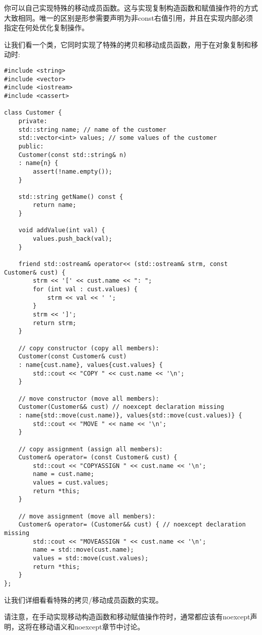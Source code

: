 你可以自己实现特殊的移动成员函数。这与实现复制构造函数和赋值操作符的方式大致相同。唯一的区别是形参需要声明为非const右值引用，并且在实现内部必须指定在何处优化复制操作。\par

让我们看一个类，它同时实现了特殊的拷贝和移动成员函数，用于在对象复制和移动时:\par

{\color{red}{basics/customerimpl.hpp}}

\begin{lstlisting}[caption={}]
#include <string>
#include <vector>
#include <iostream>
#include <cassert>

class Customer {
	private:
	std::string name; // name of the customer
	std::vector<int> values; // some values of the customer
	public:
	Customer(const std::string& n)
	: name{n} {
		assert(!name.empty());
	}

	std::string getName() const {
		return name;
	}

	void addValue(int val) {
		values.push_back(val);
	}

	friend std::ostream& operator<< (std::ostream& strm, const Customer& cust) {
		strm << '[' << cust.name << ": ";
		for (int val : cust.values) {
			strm << val << ' ';
		}
		strm << ']';
		return strm;
	}

	// copy constructor (copy all members):
	Customer(const Customer& cust)
	: name{cust.name}, values{cust.values} {
		std::cout << "COPY " << cust.name << '\n';
	}

	// move constructor (move all members):
	Customer(Customer&& cust) // noexcept declaration missing
	: name{std::move(cust.name)}, values{std::move(cust.values)} {
		std::cout << "MOVE " << name << '\n';
	}

	// copy assignment (assign all members):
	Customer& operator= (const Customer& cust) {
		std::cout << "COPYASSIGN " << cust.name << '\n';
		name = cust.name;
		values = cust.values;
		return *this;
	}

	// move assignment (move all members):
	Customer& operator= (Customer&& cust) { // noexcept declaration missing
		std::cout << "MOVEASSIGN " << cust.name << '\n';
		name = std::move(cust.name);
		values = std::move(cust.values);
		return *this;
	}
};
\end{lstlisting}

让我们详细看看特殊的拷贝/移动成员函数的实现。\par

请注意，在手动实现移动构造函数和移动赋值操作符时，通常都应该有noexcept声明，这将在移动语义和noexcept章节中讨论。\par

